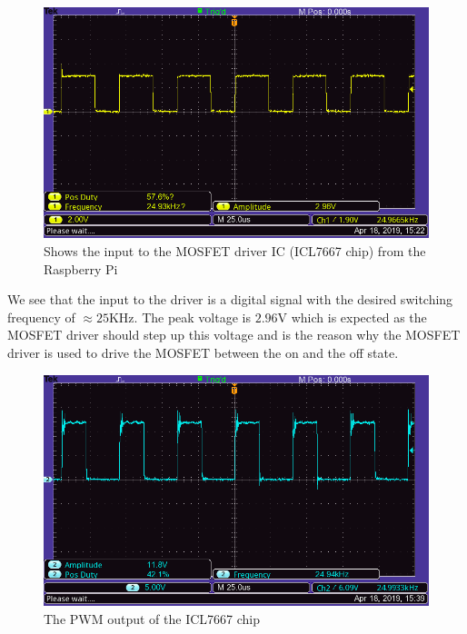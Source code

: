 \documentclass[a4paper, 12pt]{article}
\begin{document}
\begin{figure}[H]
  \centering
  \includegraphics[width=\textwidth]{images/pwm_input_from_pi.png}
  \caption{Shows the input to the MOSFET driver IC (ICL7667 chip) from the Raspberry Pi}
  \label{fig:pwm_input_from_pi}
\end{figure}

We see that the input to the driver is a digital signal with the desired switching frequency of $\approx 25$KHz. The peak voltage is $2.96$V which is expected as the MOSFET driver should step up this voltage and is the reason why the MOSFET driver is used to drive the MOSFET between the on and the off state.

\begin{figure}[H]
  \centering
  \includegraphics[width=\textwidth]{images/pwm_output_from_chip.png}
  \caption{The PWM output of the ICL7667 chip}
  \label{fig:pwm_output_from_chip}
\end{figure}
\end{document}
